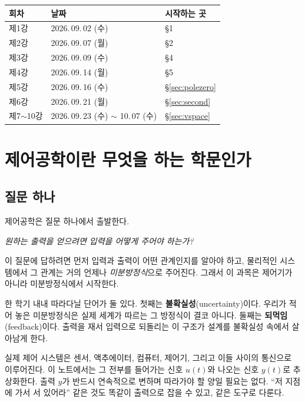 \documentclass[11pt]{article}
\begin{document}
\smallskip
\begin{center}\small
\begin{tabular}{@{}lll@{}}
\toprule
회차 & 날짜 & 시작하는 곳\\
\midrule
제1강 & 2026.\,09.\,02 (수) & \S1\\
제2강 & 2026.\,09.\,07 (월) & \S2\\
제3강 & 2026.\,09.\,09 (수) & \S4\\
제4강 & 2026.\,09.\,14 (월) & \S5\\
제5강 & 2026.\,09.\,16 (수) & \S\ref{sec:polezero}\\
제6강 & 2026.\,09.\,21 (월) & \S\ref{sec:second}\\
제7$\sim$10강 & 2026.\,09.\,23 (수) $\sim$ 10.\,07 (수) & \S\ref{sec:vspace}\\
\bottomrule
\end{tabular}
\end{center}

{\small\tableofcontents}



\section{제어공학이란 무엇을 하는 학문인가}

\subsection{질문 하나} 제어공학은 질문 하나에서 출발한다.
\begin{center}
\emph{원하는 출력을 얻으려면 입력을 어떻게 주어야 하는가?}
\end{center}
이 질문에 답하려면 먼저 입력과 출력이 어떤 관계인지를 알아야 하고, 물리적인
시스템에서 그 관계는 거의 언제나 \emph{미분방정식}으로 주어진다. 그래서 이
과목은 제어기가 아니라 미분방정식에서 시작한다.

한 학기 내내 따라다닐 단어가 둘 있다. 첫째는 \textbf{불확실성}(uncertainty)이다.
우리가 적어 놓은 미분방정식은 실제 세계가 따르는 그 방정식이 결코 아니다. 둘째는
\textbf{되먹임}(feedback)이다. 출력을 재서 입력으로 되돌리는 이 구조가 설계를
불확실성 속에서 살아남게 한다.

실제 제어 시스템은 센서, 액추에이터, 컴퓨터, 제어기, 그리고 이들 사이의 통신으로
이루어진다. 이 노트에서는 그 전부를 들어가는 신호 $u(t)$와 나오는 신호 $y(t)$로
추상화한다. 출력 $y$가 반드시 연속적으로 변하며 따라가야 할 양일 필요는 없다.
``저 지점에 가서 서 있어라'' 같은 것도 똑같이 출력으로 잡을 수 있고, 같은
도구로 다룬다.
\end{document}
